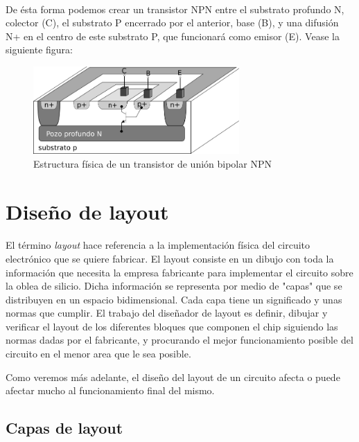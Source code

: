\paragraph{}
De ésta forma podemos crear un transistor NPN entre el substrato profundo N,
colector (C), el substrato P encerrado por el anterior, base (B), y una difusión
N+ en el centro de este substrato P, que funcionará como emisor (E). Vease la
siguiente figura:

\begin{figure}[h]
	\centering
	\includegraphics[width=0.7\textwidth]{img/npn.png}
	\caption{Estructura física de un transistor de unión bipolar NPN}
	\label{fig:npn}
\end{figure}


\section{Diseño de layout}

\paragraph{}
El término \textit{layout} hace referencia a la implementación física del circuito
electrónico que se quiere fabricar. El layout consiste en un dibujo con toda
la información que necesita la empresa fabricante para implementar el circuito
sobre la oblea de silicio. Dicha información se representa por medio de "capas"
que se distribuyen en un espacio bidimensional. Cada capa tiene un significado y
unas normas que cumplir. El trabajo del diseñador de layout es definir, dibujar y
verificar el layout de los diferentes bloques que componen el chip siguiendo
las normas dadas por el fabricante, y procurando el mejor funcionamiento posible
del circuito en el menor area que le sea posible.

Como veremos más adelante, el diseño del layout de un circuito afecta o puede afectar
mucho al funcionamiento final del mismo.

\subsection{Capas de layout}

